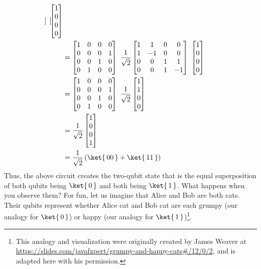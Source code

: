 \documentclass{article}
\theoremstyle{definition}
\newcommand{\kz}[1]{\ket{\,#1\,}}
\begin{document}
\begin{align}
\begin{bmatrix}
	\end{bmatrix} \ \begin{bmatrix}
		1\\
		0\\
		0\\
		0
	\end{bmatrix}\\
	&= \begin{bmatrix}
		1 & 0 & 0 & 0\\
		0 & 0 & 0 & 1\\
		0 & 0 & 1 & 0\\
		0 & 1 & 0 & 0
	\end{bmatrix} \ \frac{1}{\sqrt{2}}\begin{bmatrix}
			1 & 1 & 0 & 0\\
			1 & -1 & 0 & 0\\
			0 & 0 & 1 & 1\\
			0 & 0 & 1 & -1
		\end{bmatrix} \ \begin{bmatrix}
		1\\
		0\\
		0\\
		0
	\end{bmatrix}\\
	&= \begin{bmatrix}
		1 & 0 & 0 & 0\\
		0 & 0 & 0 & 1\\
		0 & 0 & 1 & 0\\
		0 & 1 & 0 & 0
	\end{bmatrix} \ \frac{1}{\sqrt{2}}\begin{bmatrix}
			1\\
			1\\
			0\\
			0
		\end{bmatrix}\\
	&= \frac{1}{\sqrt{2}}\begin{bmatrix}
			1\\
			0\\
			0\\
			1
		\end{bmatrix}\\
	&= \frac{1}{\sqrt{2}} \left( \kz{00} + \kz{11} \right)
\end{align}
Thus, the above circuit creates the two-qubit state that is the equal superposition of both qubits being $\kz0$ and both being $\kz1$.
What happens when you observe them?
For fun, let us imagine that Alice and Bob are both cats.  Their qubits represent whether Alice cat and Bob cat are each grumpy (our analogy for $\kz0$) or happy (our analogy for $\kz1$)\footnote{This analogy and visualization were originally created by James Weaver at \url{https://slides.com/javafxpert/grumpy-and-happy-cats\#/12/0/2}, and is adapted here with his permission.}.
\end{document}
